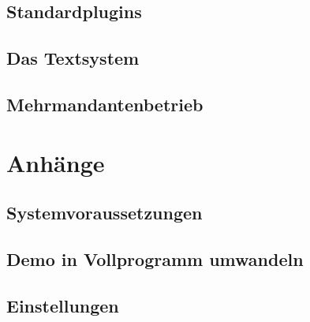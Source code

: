 \documentclass[paper=a4,BCOR8.25mm,twoside]{scrbook}
\begin{document}
\chapter{Standardplugins}
	
	
	
	
	
	
	
	
	
	
	
	
	
	
	
	
	

	
\chapter{Das Textsystem}
	
	
	


\chapter{Mehrmandantenbetrieb}
	
	
%
\part{Anhänge}
\appendix

\chapter{Systemvoraussetzungen}
	
\chapter{Demo in Vollprogramm umwandeln}
	
\chapter{Einstellungen}
	
\end{document}
